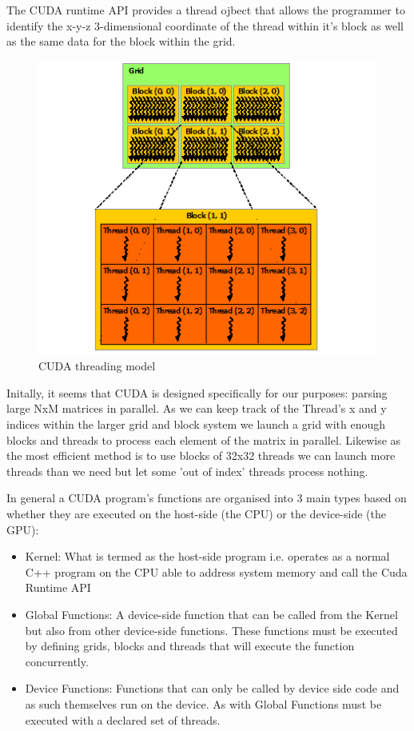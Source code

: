 \documentclass[a4paper]{amsart}
\begin{document}
The CUDA runtime API provides a thread ojbect that allows the programmer to identify the x-y-z 3-dimensional coordinate of the thread within it's block as well as the same data for the block within the grid.

\begin{figure}[h]
\centering
\includegraphics[scale=1.0]{grid-of-thread-blocks.png}
\caption {CUDA threading model}
\label {fig:CUDAthread}
\end{figure}


Initally, it seems that CUDA is designed specifically for our purposes: parsing large NxM matrices in parallel. As we can keep track of the Thread's x and y indices within the larger grid and block   system we launch a grid with enough blocks and threads to process each element of the matrix in parallel. Likewise as the most efficient method is to use blocks of 32x32 threads we can launch more threads than we need but let some 'out of index' threads process nothing.

In general a CUDA program's functions are organised into 3 main types based on whether they are executed on the host-side (the CPU) or the device-side (the GPU):

\begin{itemize}
  \item Kernel: What is termed as the host-side program i.e. operates as a normal C++ program on the CPU able to address system memory and call the Cuda Runtime API
  \item Global Functions: A device-side function that can be called from the Kernel but also from other device-side functions. These functions must be executed by defining grids, blocks and threads that will execute the function concurrently.
  \item Device Functions: Functions that can only be called by device side code and as such themselves run on the device. As with Global Functions must be executed with a declared set of threads.
\end{itemize}
\end{document}
